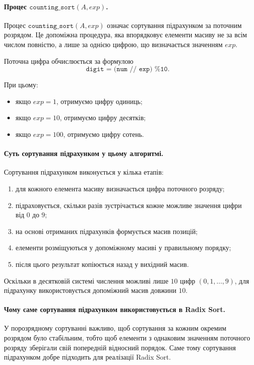 \documentclass[12pt,a4paper]{article}
\begin{document}
    \paragraph{Процес $\texttt{counting\_sort}(A, exp)$.}
    Процес $\texttt{counting\_sort}(A, exp)$ означає сортування підрахунком за поточним розрядом.
    Це допоміжна процедура, яка впорядковує елементи масиву не за всім числом повністю, а лише за однією цифрою, що визначається значенням $exp$.

    Поточна цифра обчислюється за формулою
    \[
    \texttt{digit = (num // exp) \% 10}.
    \]

    При цьому:
    \begin{itemize}
        \item якщо $exp = 1$, отримуємо цифру одиниць;
        \item якщо $exp = 10$, отримуємо цифру десятків;
        \item якщо $exp = 100$, отримуємо цифру сотень.
    \end{itemize}

    \paragraph{Суть сортування підрахунком у цьому алгоритмі.}
    Сортування підрахунком виконується у кілька етапів:
    \begin{enumerate}
        \item для кожного елемента масиву визначається цифра поточного розряду;
        \item підраховується, скільки разів зустрічається кожне можливе значення цифри від $0$ до $9$;
        \item на основі отриманих підрахунків формується масив позицій;
        \item елементи розміщуються у допоміжному масиві у правильному порядку;
        \item після цього результат копіюється назад у вихідний масив.
    \end{enumerate}

    Оскільки в десятковій системі числення можливі лише $10$ цифр $(0,1,\dots,9)$, для підрахунку використовується допоміжний масив довжини $10$.

    \paragraph{Чому саме сортування підрахунком використовується в Radix Sort.}
    У порозрядному сортуванні важливо, щоб сортування за кожним окремим розрядом було стабільним, тобто щоб елементи з однаковим значенням поточного розряду зберігали свій попередній відносний порядок.
    Саме тому сортування підрахунком добре підходить для реалізації Radix Sort.
\end{document}
